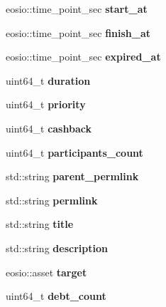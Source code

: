 \begin{DoxyCompactItemize}
eosio\+::time\+\_\+point\+\_\+sec {\bfseries start\+\_\+at}
\item 
\mbox{\label{structgoals_abec8eece24c1cd0febe0d20448b0e3bd}} 
eosio\+::time\+\_\+point\+\_\+sec {\bfseries finish\+\_\+at}
\item 
\mbox{\label{structgoals_a054538540aa86753bde7bce3094c0a6b}} 
eosio\+::time\+\_\+point\+\_\+sec {\bfseries expired\+\_\+at}
\item 
\mbox{\label{structgoals_a2e0dc500739ead42a7cfdbfd40145974}} 
uint64\+\_\+t {\bfseries duration}
\item 
\mbox{\label{structgoals_a08c4cae575347e4a488c2faa683675e8}} 
uint64\+\_\+t {\bfseries priority}
\item 
\mbox{\label{structgoals_af480984561a63a25749e9966d4bfc37d}} 
uint64\+\_\+t {\bfseries cashback}
\item 
\mbox{\label{structgoals_a22853976bd6c35645ee53f4e0cf57748}} 
uint64\+\_\+t {\bfseries participants\+\_\+count}
\item 
\mbox{\label{structgoals_a08fdb21801bdc67fd56c3aa7b7039309}} 
std\+::string {\bfseries parent\+\_\+permlink}
\item 
\mbox{\label{structgoals_a4eeb86cdbe42120c4945d566fb24889e}} 
std\+::string {\bfseries permlink}
\item 
\mbox{\label{structgoals_a11180e768d20241137069484b9c9cb65}} 
std\+::string {\bfseries title}
\item 
\mbox{\label{structgoals_a8a42593c3da900821bbd980f85c8fb51}} 
std\+::string {\bfseries description}
\item 
\mbox{\label{structgoals_a0a521876420d2c69fe308854d5c48fa1}} 
eosio\+::asset {\bfseries target}
\item 
\mbox{\label{structgoals_af44690442247cc7759c9c5e14b9b8146}} 
uint64\+\_\+t {\bfseries debt\+\_\+count}
\item 

\end{DoxyCompactItemize}
